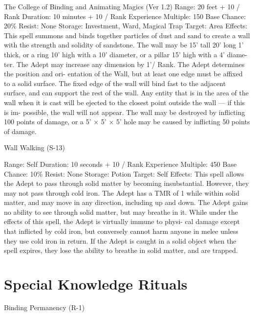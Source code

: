 \begin{Chapter}{The College of Binding and Animating Magics (Ver 1.2)}
Range: 20 feet + 10 / Rank 
Duration: 10 minutes + 10 / Rank 
Experience Multiple: 150 
Base Chance: 20\% 
Resist: None 
Storage: Investment, Ward, Magical Trap 
Target: Area 
Effects:  This  spell  summons  and  binds  together 
particles of dust and sand to create a wall with the 
strength and solidity of sandstone. The wall may be 
15’ tall 20’ long 1’ thick, or a ring 10’ high with a 
10’ diameter, or a pillar 15’ high with a 4’ diame-
ter. The  Adept may increase any dimension by 1’/ 
Rank.  The  Adept  determines  the  position  and  ori-
entation of the Wall, but at least one edge must be 
affixed  to  a  solid  surface.  The  fixed  edge  of  the 
wall will bind fast to the adjacent surface, and can 
support the rest of the wall. Any entity that is in the 
area  of  the  wall  when  it  is  cast  will  be  ejected  to 
the  closest  point  outside  the  wall  —  if  this  is  im-
possible, the wall will not appear. The wall may be 
destroyed  by  inflicting 100  points  of  damage,  or  a 
5’  ×  5’  ×  5’  hole  may  be  caused  by  inflicting  50 
points of damage. 

Wall Walking (S-13) 

Range: Self 
Duration: 10 seconds + 10 / Rank 
Experience Multiple: 450 
Base Chance: 10\% 
Resist: None 
Storage: Potion 
Target: Self 
Effects: This spell allows the Adept to pass through 
solid  matter  by  becoming  insubstantial.  However, 
they  may  not  pass  through  cold  iron.  The  Adept 
has a TMR of 1 while within solid matter, and may 
move in any direction, including up and down. The 
Adept gains no ability to see through solid matter, 
but  may  breathe  in  it.  While  under  the  effects  of 
this  spell,  the  Adept  is  virtually  immune  to  physi-
cal  damage  except  that  inflicted  by  cold  iron,  but 
conversely  cannot  harm  anyone  in  melee  unless 
they use cold iron in return. If the Adept is caught 
in  a  solid  object  when  the  spell  expires,  they  lose 
the  ability  to  breathe  in  solid  matter,  and  are 
trapped. 

\section{Special Knowledge Rituals}

Binding Permanency (R-1) 


\end{Chapter}
